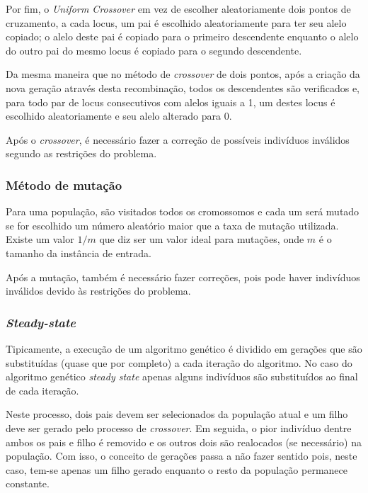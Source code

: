 \documentclass[conference]{IEEEtran}
\begin{document}
        Por fim, o \textit{Uniform Crossover} em vez de escolher aleatoriamente dois pontos de cruzamento, a cada locus, um pai é escolhido aleatoriamente para ter seu alelo copiado; o alelo
        deste pai é copiado para o primeiro descendente enquanto o alelo do outro pai do mesmo locus é copiado para o segundo descendente.

        Da mesma maneira que no método de \textit{crossover} de dois pontos, após a criação da nova geração através desta recombinação, todos os descendentes são verificados e, para todo par de locus
        consecutivos com alelos iguais a 1, um destes locus é escolhido aleatoriamente e seu alelo alterado para 0.

        Após o \textit{crossover}, é necessário fazer a correção de possíveis indivíduos inválidos segundo as restrições do problema.

    \subsubsection{Método de mutação}

         Para uma população, são visitados todos os cromossomos e cada um será mutado se for escolhido um número aleatório maior que a taxa de mutação utilizada. Existe um valor $1/m$
         \cite{gendreau2010handbook} que diz ser um valor ideal para mutações, onde $m$ é o tamanho da instância de entrada.
         
        Após a mutação, também é necessário fazer correções, pois pode haver indivíduos inválidos devido às restrições do problema.


    \subsubsection{\emph{Steady-state}}

        Tipicamente, a execução de um algoritmo genético é dividido em gerações que são substituídas (quase que por completo) a cada iteração do algoritmo. No caso do algoritmo genético
        \emph{steady state} apenas alguns indivíduos são substituídos ao final de cada iteração.

        Neste processo, dois pais devem ser selecionados da população atual e um filho deve ser gerado pelo processo de \emph{crossover}. Em seguida, o pior indivíduo dentre ambos os pais e filho é
        removido e os outros dois são realocados (se necessário) na população. Com isso, o conceito de gerações passa a não fazer sentido pois, neste caso, tem-se apenas um filho gerado enquanto o
        resto da população permanece constante.  
\end{document}
